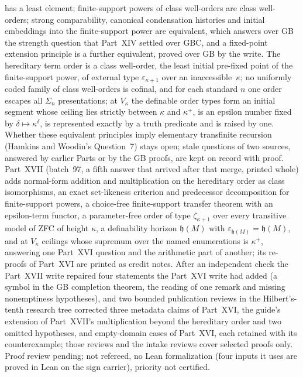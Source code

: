 \documentclass[11pt]{article}
\begin{document}
{has a least element; finite-support powers of class well-orders are class
well-orders; strong comparability, canonical condensation histories and
initial embeddings into the finite-support power are equivalent, which
answers over GB the strength question that Part~XIV settled over GBC, and
a fixed-point extension principle is a further equivalent, proved over GB
by the write.  The hereditary term order is a class well-order, the least
initial pre-fixed point of the finite-support power, of external type
$\varepsilon_{\kappa+1}$ over an inaccessible~$\kappa$; no uniformly coded
family of class well-orders is cofinal, and for each standard $n$ one
order escapes all $\Sigma_n$ presentations; at $V_\kappa$ the definable
order types form an initial segment whose ceiling lies strictly between
$\kappa$ and $\kappa^+$, is an epsilon number fixed by
$\delta\mapsto\kappa^\delta$, is represented exactly by a truth predicate
and is raised by one.  Whether these equivalent principles imply
elementary transfinite recursion (Hamkins and Woodin's Question~7) stays
open; stale questions of two sources, answered by earlier Parts or by the
GB proofs, are kept on record with proof.  Part~XVII (batch~97, a fifth
answer that arrived after that merge, printed whole) adds normal-form
addition and multiplication on the hereditary order as class
isomorphisms, an exact set-likeness criterion and predecessor
decomposition for finite-support powers, a choice-free finite-support
transfer theorem with an epsilon-term functor, a parameter-free order of
type $\zeta_{\kappa+1}$ over every transitive model of ZFC of height
$\kappa$, a definability horizon $\mathfrak h(M)$ with
$\varepsilon_{\mathfrak h(M)}=\mathfrak h(M)$, and at $V_\kappa$ ceilings
whose supremum over the named enumerations is $\kappa^+$, answering one
Part~XVI question and the arithmetic part of another; its re-proofs of
Part~XVI are printed as credit notes.  After an independent check the
Part~XVII write repaired four statements the Part~XVI write had added (a
symbol in the GB completion theorem, the reading of one remark and missing
nonemptiness hypotheses),
and two bounded publication reviews in the Hilbert's-tenth research tree
corrected three metadata claims of Part~XVI, the guide's extension of
Part~XVII's multiplication beyond the hereditary order and two omitted
hypotheses, and empty-domain cases of Part~XVI, each retained with its
counterexample; those reviews and the intake reviews cover selected
proofs only.
Proof review pending; not refereed, no Lean formalization (four
inputs it uses are proved in Lean on the sign carrier), priority not
certified.}
\end{document}
